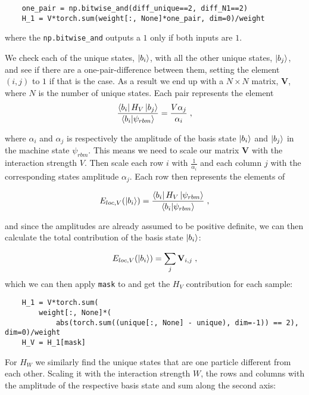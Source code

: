 \begin{verbatim} 
    one_pair = np.bitwise_and(diff_unique==2, diff_N1==2)
    H_1 = V*torch.sum(weight[:, None]*one_pair, dim=0)/weight
\end{verbatim}

where the \texttt{np.bitwise_and} outputs a $1$ only if both inputs are $1$. 

We check each of the unique states, $\ket{b_i}$, with all the other unique states, $\ket{b_j}$, and see if there are a one-pair-difference between them, setting the element $\left (i, j \right )$ to $1$ if that is the case. As a result we end up with a $N\times N$ matrix, $\mathbf{V}$, where $N$ is the number of unique states. Each pair represents the element
\begin{equation}
  \frac{\bra{b_i}H_V\ket{b_j}}{\braket{b_i}{\psi_{rbm}}} = \frac{V\alpha_j}{\alpha_i} \; ,
  \label{eq:LMG_imp_V_cont}
\end{equation}

where $\alpha_i$ and $\alpha_j$ is respectively the amplitude of the basis state $\ket{b_i}$ and $\ket{b_j}$ in the machine state $\psi_{rbm}$. This means we need to scale our matrix $\mathbf{V}$ with the interaction strength $V$. Then scale each row $i$ with $\frac{1}{\alpha_i}$ and each column $j$ with the corresponding states amplitude $\alpha_j$. Each row then represents the elements of 

$$ E_{loc, V}(\ket{b_i}) = \frac{\bra{b_i}H_V\ket{\psi_{rbm}}}{\braket{b_i}{\psi_{rbm}}} \; , $$

and since the amplitudes are already assumed to be positive definite, we can then calculate the total contribution of the basis state $\ket{b_i}$:

\begin{equation}
 E_{loc, V}(\ket{b_i})= \sum_j \mathbf{V}_{i,j} \; ,
\end{equation}
which we can then apply \texttt{mask} to and get the $H_V$ contribution for each sample:

\begin{verbatim}
    H_1 = V*torch.sum(
        weight[:, None]*(
            abs(torch.sum((unique[:, None] - unique), dim=-1)) == 2), dim=0)/weight
    H_V = H_1[mask]
\end{verbatim}

For $H_W$ we similarly find the unique states that are one particle different from each other. Scaling it with the interaction strength $W$, the rows and columns with the amplitude of the respective basis state and sum along the second axis:

